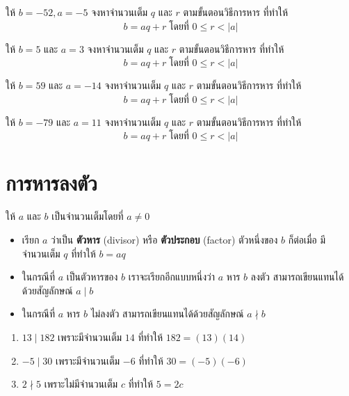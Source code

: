 \begin{examplebox}
	ให้ $b=-52, a=-5$ จงหาจำนวนเต็ม $q$ และ $r$ ตามขั้นตอนวิธีการหาร ที่ทำให้ \\
	\[b=aq+r\;\text{โดยที่ $0 \leq r<|a|$}\] 
\end{examplebox}
\solution
\vspace{3cm}  

\begin{examplebox}
	ให้ $b=5$ และ $a=3$ จงหาจำนวนเต็ม $q$ และ $r$ ตามขั้นตอนวิธีการหาร ที่ทำให้ \\
	\[b=aq+r\;\text{โดยที่ $0 \leq r<|a|$}\]
\end{examplebox}
\solution
\vspace{3cm}  

\begin{examplebox}
	ให้ $b=59$ และ $a=-14$ จงหาจำนวนเต็ม $q$ และ $r$ ตามขั้นตอนวิธีการหาร ที่ทำให้ \\
	\[b=aq+r\;\text{โดยที่ $0 \leq r<|a|$}\] 
\end{examplebox}
	\solution
\newpage


\begin{examplebox}
	ให้ $b=-79$ และ $a=11$ จงหาจำนวนเต็ม $q$ และ $r$ ตามขั้นตอนวิธีการหาร ที่ทำให้ \\
	\[b=aq+r\;\text{โดยที่ $0 \leq r<|a|$}\]
\end{examplebox}
\solution


\newpage
\section{การหารลงตัว}
\begin{definitionbox}
	ให้ $a$ และ $b$ เป็นจำนวนเต็มโดยที่ $a \neq 0$
	\begin{itemize}
		\item เรียก $a$ ว่าเป็น \textbf{ตัวหาร} (divisor) หรือ \textbf{ตัวประกอบ} (factor) ตัวหนึ่งของ $b$ ก็ต่อเมื่อ มีจำนวนเต็ม $q$ ที่ทำให้ $b=a q$
		\item ในกรณีที่ $a$ เป็นตัวหารของ $b$ เราจะเรียกอีกแบบหนึ่งว่า $a$ หาร $b$ ลงตัว สามารถเขียนแทนได้ด้วยสัญลักษณ์ $a \mid b$
		\item ในกรณีที่ $a$ หาร $b$ ไม่ลงตัว สามารถเขียนแทนได้ด้วยสัญลักษณ์ $a \nmid b$
	\end{itemize}
\end{definitionbox}

\begin{examplebox}
	\begin{enumerate}
		\item $13 \mid 182$ เพราะมีจำนวนเต็ม $14$ ที่ทำให้ $182=(13)(14)$
		\item $-5 \mid 30$ เพราะมีจำนวนเต็ม $-6$ ที่ทำให้ $30=(-5)(-6)$
		\item $2 \nmid 5$ เพราะไม่มีจำนวนเต็ม $c$ ที่ทำให้ $5=2c$
	\end{enumerate}    
\end{examplebox}

